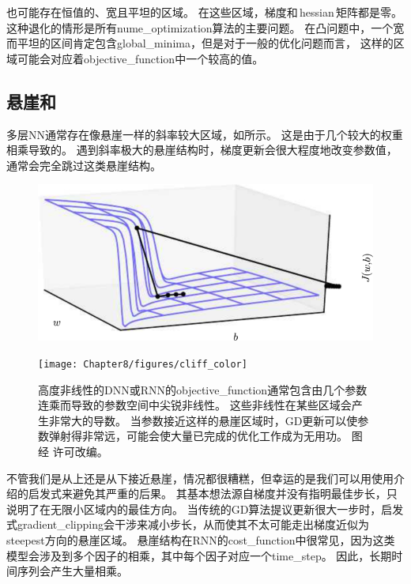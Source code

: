 也可能存在恒值的、宽且平坦的区域。
在这些区域，梯度和\,\gls{hessian}\,矩阵都是零。
这种退化的情形是所有\gls{nume_optimization}算法的主要问题。
在凸问题中，一个宽而平坦的区间肯定包含\gls{global_minima}，但是对于一般的优化问题而言，
这样的区域可能会对应着\gls{objective_function}中一个较高的值。


\subsection{悬崖和}
\label{sec:cliffs_and_exploding_gradients}
多层\gls{NN}通常存在像悬崖一样的斜率较大区域，如所示。
这是由于几个较大的权重相乘导致的。
遇到斜率极大的悬崖结构时，梯度更新会很大程度地改变参数值，通常会完全跳过这类悬崖结构。


\begin{figure}[!htb]
\ifOpenSource
\centerline{\includegraphics[scale=0.5]{images/65.png}}
\else
\centerline{\texttt{[image: Chapter8/figures/cliff\_color]}}
\fi
\caption{高度非线性的\gls{DNN}或\gls{RNN}的\gls{objective_function}通常包含由几个参数连乘而导致的参数空间中尖锐非线性。
这些非线性在某些区域会产生非常大的导数。
当参数接近这样的悬崖区域时，\gls{GD}更新可以使参数弹射得非常远，可能会使大量已完成的优化工作成为无用功。
图经 \citet{Pascanu-et-al-2013}许可改编。}
\label{fig:chap8_cliff}
\end{figure}


不管我们是从上还是从下接近悬崖，情况都很糟糕，但幸运的是我们可以用使用介绍的启发式来避免其严重的后果。
其基本想法源自梯度并没有指明最佳步长，只说明了在无限小区域内的最佳方向。
当传统的\gls{GD}算法提议更新很大一步时，启发式\gls{gradient_clipping}会干涉来减小步长，从而使其不太可能走出梯度近似为\gls{steepest}方向的悬崖区域。
悬崖结构在\gls{RNN}的\gls{cost_function}中很常见，因为这类模型会涉及到多个因子的相乘，其中每个因子对应一个\gls{time_step}。
因此，长期时间序列会产生大量相乘。


